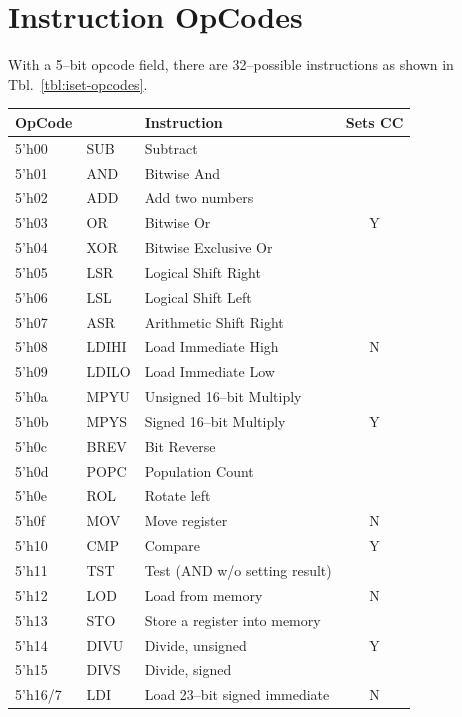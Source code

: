 \documentclass{gqtekspec}
\begin{document}
\section{Instruction OpCodes}
With a 5--bit opcode field, there are 32--possible instructions as shown in 
Tbl.~\ref{tbl:iset-opcodes}.
\begin{table}\begin{center}
\begin{tabular}{|l|l|l|c|} \hline \rowcolor[gray]{0.85}
OpCode & & Instruction &Sets CC \\\hline\hline
5'h00 & SUB & Subtract &   \\\cline{1-3}
5'h01 & AND & Bitwise And &   \\\cline{1-3}
5'h02 & ADD & Add two numbers &   \\\cline{1-3}
5'h03 & OR  & Bitwise Or & Y \\\cline{1-3}
5'h04 & XOR & Bitwise Exclusive Or &   \\\cline{1-3}
5'h05 & LSR & Logical Shift Right &   \\\cline{1-3}
5'h06 & LSL & Logical Shift Left &   \\\cline{1-3}
5'h07 & ASR & Arithmetic Shift Right &   \\\hline
5'h08 & LDIHI & Load Immediate High & N \\\cline{1-3}
5'h09 & LDILO & Load Immediate Low &  \\\hline
5'h0a & MPYU & Unsigned 16--bit Multiply &  \\\cline{1-3}
5'h0b & MPYS & Signed 16--bit Multiply & Y \\\cline{1-3}
5'h0c & BREV & Bit Reverse &  \\\cline{1-3}
5'h0d & POPC& Population Count &  \\\cline{1-3}
5'h0e & ROL & Rotate left &   \\\hline
5'h0f & MOV & Move register & N \\\hline
5'h10 & CMP & Compare & Y \\\cline{1-3}
5'h11 & TST & Test (AND w/o setting result) &   \\\hline
5'h12 & LOD & Load from memory & N \\\cline{1-3}
5'h13 & STO & Store a register into memory &  \\\hline\hline
5'h14 & DIVU & Divide, unsigned & Y \\\cline{1-3}
5'h15 & DIVS & Divide, signed &  \\\hline\hline
5'h16/7 & LDI & Load 23--bit signed immediate & N \\\hline\hline

\end{tabular}
\end{center}
\end{table}
\end{document}
